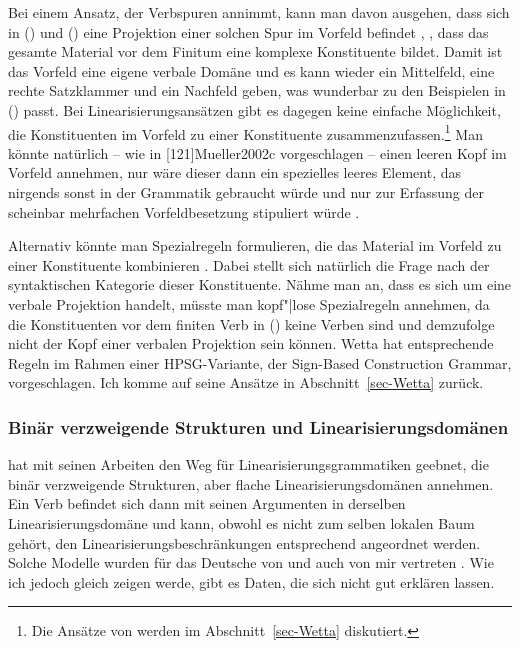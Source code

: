 \noindent
Bei einem Ansatz, der Verbspuren annimmt, kann man davon ausgehen, dass sich in () und () eine Projektion
einer solchen Spur im Vorfeld befindet \citep[316]{Mueller2005d}, \dash, dass das gesamte Material
vor dem Finitum eine komplexe Konstituente bildet. Damit ist das Vorfeld eine eigene verbale Domäne
und es kann wieder ein Mittelfeld, eine rechte Satzklammer und ein Nachfeld geben, was wunderbar zu
den Beispielen in () passt. Bei Linearisierungsansätzen gibt es dagegen keine einfache Möglichkeit, 
die Konstituenten im Vorfeld zu einer Konstituente zusammenzufassen.\footnote{%
Die Ansätze von \citet{Wetta2011a,Wetta2014a-u,Wetta2018a} werden im Abschnitt~\ref{sec-Wetta} diskutiert.
} Man
könnte natürlich -- wie in [121]{Mueller2002c} vorgeschlagen 
-- einen leeren Kopf im Vorfeld annehmen, nur wäre dieser dann ein spezielles leeres Element,
das nirgends sonst in der Grammatik gebraucht würde
und nur zur Erfassung der scheinbar mehrfachen Vorfeldbesetzung stipuliert würde \citep[322]{Mueller2005d}.

Alternativ könnte man Spezialregeln formulieren, die das Material
im Vorfeld zu einer Konstituente kombinieren \citep[Abschnitt~7.6]{Welke2019a-u}. Dabei stellt sich natürlich die Frage nach
der syntaktischen Kategorie dieser Konstituente. Nähme man an, dass es sich um eine verbale
Projektion handelt, müsste man kopf"|lose Spezialregeln annehmen, da die Konstituenten vor dem finiten
Verb in () keine Verben sind und demzufolge nicht der Kopf einer verbalen Projektion sein
können. Wetta hat entsprechende Regeln im Rahmen einer HPSG-Variante, der Sign-Based Construction Grammar\indexsbcg,
vorgeschlagen. Ich komme auf seine Ansätze in Abschnitt~\ref{sec-Wetta} zurück.

\subsubsection{Binär verzweigende Strukturen und Linearisierungsdomänen}
\label{sec-Linearisierung}
\label{sec-Reape-Linearisierung}

\citet{Reape90a,Reape92a,Reape94a} hat mit seinen Arbeiten 
den Weg für Linearisierungsgrammatiken geebnet,
die binär verzweigende Strukturen, aber flache Linearisierungsdomänen annehmen. Ein Verb
befindet sich dann mit seinen Argumenten in derselben Linearisierungsdomäne und kann,
obwohl es nicht zum selben lokalen Baum gehört, den Linearisierungsbeschränkungen entsprechend
angeordnet werden. Solche Modelle wurden für das Deutsche von \citet{Kathol95a,Kathol2000a} und 
auch von mir vertreten \citep{Mueller95c,Mueller99a,Mueller2002b}. Wie ich jedoch gleich zeigen
werde, gibt es Daten, die sich nicht gut erklären lassen. 

